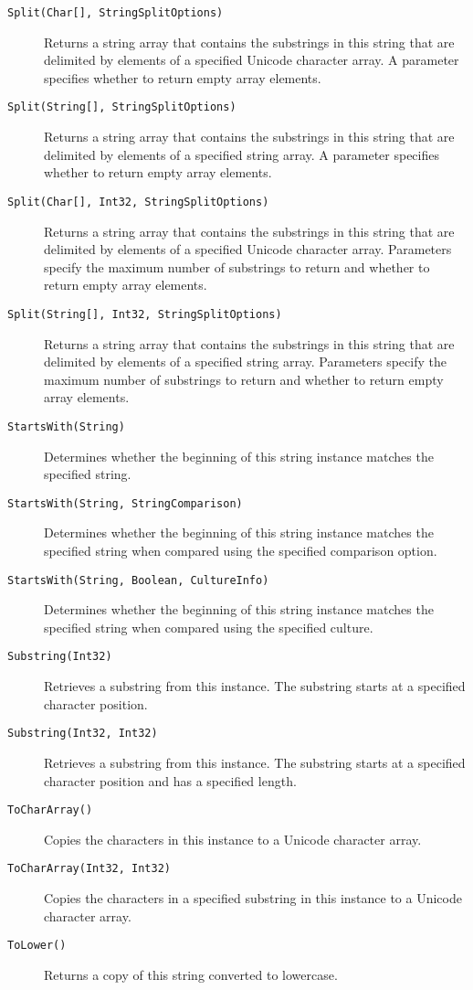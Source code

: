 \begin{description}
\item[\texttt{Split(Char[], StringSplitOptions)}] Returns a string array that contains the substrings in this string that are delimited by elements of a specified Unicode character array. A parameter specifies whether to return empty array elements.
\item[\texttt{Split(String[], StringSplitOptions)}] Returns a string array that contains the substrings in this string that are delimited by elements of a specified string array. A parameter specifies whether to return empty array elements.
\item[\texttt{Split(Char[], Int32, StringSplitOptions)}] Returns a string array that contains the substrings in this string that are delimited by elements of a specified Unicode character array. Parameters specify the maximum number of substrings to return and whether to return empty array elements.
\item[\texttt{Split(String[], Int32, StringSplitOptions)}] Returns a string array that contains the substrings in this string that are delimited by elements of a specified string array. Parameters specify the maximum number of substrings to return and whether to return empty array elements.
\item[\texttt{StartsWith(String)}] Determines whether the beginning of this string instance matches the specified string.
\item[\texttt{StartsWith(String, StringComparison)}] Determines whether the beginning of this string instance matches the specified string when compared using the specified comparison option.
\item[\texttt{StartsWith(String, Boolean, CultureInfo)}] Determines whether the beginning of this string instance matches the specified string when compared using the specified culture.
\item[\texttt{Substring(Int32)}] Retrieves a substring from this instance. The substring starts at a specified character position.
\item[\texttt{Substring(Int32, Int32)}] Retrieves a substring from this instance. The substring starts at a specified character position and has a specified length.
\item[\texttt{ToCharArray()}] Copies the characters in this instance to a Unicode character array.
\item[\texttt{ToCharArray(Int32, Int32)}] Copies the characters in a specified substring in this instance to a Unicode character array.
\item[\texttt{ToLower()}] Returns a copy of this string converted to lowercase.

\end{description}
